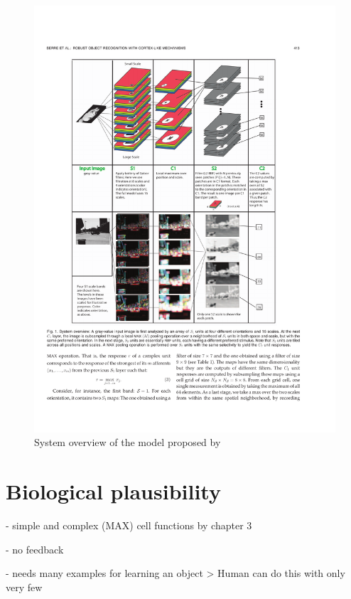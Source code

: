 			\begin{figure}[H]
				\centering
				\includegraphics[width=\textwidth, trim= 2.5cm 15.35cm 4cm 3.5cm, clip]{images/serre-appearance-based-model.pdf}
				\caption{System overview of the model proposed by \citeauthor{serre2007robust}}
				\label{serre-model}
			\end{figure}
			
			
	\section{Biological plausibility}

		- simple and complex (MAX) cell functions by \cite{serre2005theory} chapter 3
	
		- no feedback
		
		- needs many examples for learning an object
			> Human can do this with only very few
		
